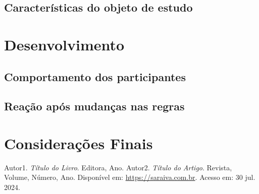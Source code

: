 \documentclass[a4paper,12pt]{article}
\begin{document}
\subsection{Características do objeto de estudo}
\lipsum[7-8]
\cite{ref1}

\section{Desenvolvimento}
\lipsum[9-10]
\cite{ref2}

\subsection{Comportamento dos participantes}
\lipsum[11-12]

\subsection{Reação após mudanças nas regras}
\lipsum[13-14]

\newpage

\section{Considerações Finais}
\lipsum[15-16]

\newpage

\begin{thebibliography}{9} %
     Autor1. \textit{Título do Livro}. Editora, Ano.
     Autor2. \textit{Título do Artigo}. Revista, Volume, Número, Ano. Disponível em: \url{https://saraiva.com.br}. Acesso em: 30 jul. 2024.
\end{thebibliography}
\end{document}
